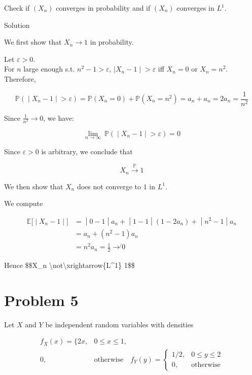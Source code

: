 \documentclass{qlnotes-export}
\begin{document}
Check if \(\left( X_{n} \right)\) converges in probability and if \(\left( X_{n} \right)\) converges in \(L^{1}\).

\begin{qlsolution}{Solution}

We first show that \(X_{n}\rightarrow 1\) in probability.

Let \(\varepsilon > 0\).\\
For \(n\) large enough s.t. \(n^{2} - 1 > \varepsilon\), \(\left. |X_{n} - 1 \middle| > \varepsilon \right.\) iff \(X_{n} = 0\) or \(X_{n} = n^{2}\). Therefore,

\[\left. {\mathbb{P}}( \middle| X_{n} - 1 \middle| > \varepsilon) = {\mathbb{P}}(X_{n} = 0) + {\mathbb{P}}(X_{n} = n^{2}) = a_{n} + a_{n} = 2a_{n} = \frac{1}{n^{2}} \right.\]

Since \(\frac{1}{n^{2}}\rightarrow 0\), we have:

\[\left. \lim\limits_{n\rightarrow\infty}\ {\mathbb{P}}( \middle| X_{n} - 1 \middle| > \varepsilon) = 0 \right.\]

Since \(\varepsilon > 0\) is arbitrary, we conclude that

\[X_{n}\overset{\mathbb{P}}{\rightarrow}1\]

We then show that \(X_{n}\) does not converge to \(1\) in \(L^{1}\).

We compute

\[\begin{matrix}
\left. {\mathbb{E}}\lbrack \middle| X_{n} - 1 \middle| \rbrack \right. & \left. = \middle| 0 - 1 \middle| a_{n} + \middle| 1 - 1 \middle| (1 - 2a_{n}) + \middle| n^{2} - 1 \middle| a_{n} \right. \\
 & {= a_{n} + (n^{2} - 1)a_{n}} \\
 & {= n^{2}a_{n} = \frac{1}{2}\operatorname{\rightarrow\not{}}0}
\end{matrix}\]

Hence \$\$X\_n \textbackslash not\textbackslash xrightarrow\{L\^{}1\} 1\$\$

\end{qlsolution}

\section{Problem 5}\label{problem-5-4}

Let \(X\) and \(Y\) be independent random variables with densities

\[\begin{matrix}
{f_{X}(x) = \{ 2x,} & {0 \leq x \leq 1,} \\
{0,} & {\text{otherwise}\quad f_{Y}(y) = \left\{ \begin{matrix}
{1/2,} & {0 \leq y \leq 2} \\
{0,} & \text{otherwise}
\end{matrix} \right.}
\end{matrix}\]
\end{document}

